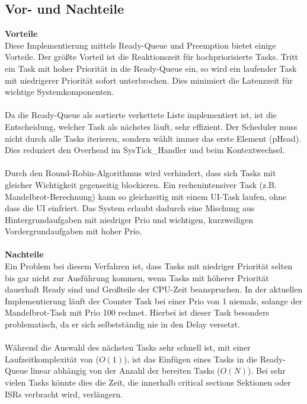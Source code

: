 \documentclass[12pt,naustrian,a4widepaper]{scrartcl}
\begin{document}
\subsection{Vor- und Nachteile}
\textbf{Vorteile}\\
Diese Implementierung mittels Ready-Queue und Preemption bietet einige Vorteile.
Der größte Vorteil ist die Reaktionszeit für hochpriorisierte Tasks.
Tritt ein Task mit hoher Priorität in die Ready-Queue ein, so wird ein laufender Task mit niedrigerer Priorität sofort unterbrochen. 
Dies minimiert die Latenzzeit für wichtige Systemkomponenten.
\\
\\
Da die Ready-Queue als sortierte verkettete Liste implementiert ist, ist die Entscheidung, welcher Task als nächstes läuft, sehr effizient.
Der Scheduler muss nicht durch alle Tasks iterieren, sondern wählt immer das erste Element (pHead).
Dies reduziert den Overhead im SysTick\_Handler und beim Kontextwechsel.
\\
\\
Durch den Round-Robin-Algorithmus wird verhindert, dass sich Tasks mit gleicher Wichtigkeit gegenseitig blockieren.
Ein rechenintensiver Task (z.B. Mandelbrot-Berechnung) kann so gleichzeitig mit einem UI-Task laufen, ohne dass die UI einfriert.
Das System erlaubt dadurch eine Mischung aus Hintergrundaufgaben mit niedriger Prio und wichtigen, kurzweiligen Vordergrundaufgaben mit hoher Prio.
\\
\\
\textbf{Nachteile}\\
Ein Problem bei diesem Verfahren ist, dass Tasks mit niedriger Priorität selten bis gar nicht zur Ausführung kommen, wenn Tasks mit höherer Priorität dauerhaft Ready sind und Großteile der CPU-Zeit beanspruchen.
In der aktuellen Implementierung läuft der Counter Task bei einer Prio von 1 niemals, solange der Mandelbrot-Task mit Prio 100 rechnet.
Hierbei ist dieser Task besonders problematisch, da er sich selbstständig nie in den Delay versetzt.
\\
\\
Während die Auswahl des nächsten Tasks sehr schnell ist, mit einer Laufzeitkomplexität von ($O(1)$), ist das Einfügen eines Tasks in die Ready-Queue linear abhängig von der Anzahl der bereiten Tasks ($O(N)$).
Bei sehr vielen Tasks könnte dies die Zeit, die innerhalb critical sections Sektionen oder ISRs verbracht wird, verlängern.

\end{document}
